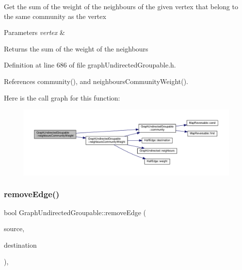 Get the sum of the weight of the neighbours of the given vertex that belong to the same community as the vertex


\begin{DoxyParams}{Parameters}
{\em vertex} & \\
\hline
\end{DoxyParams}
\begin{DoxyReturn}{Returns}
the sum of the weight of the neighbours 
\end{DoxyReturn}


Definition at line 686 of file graph\+Undirected\+Groupable.\+h.



References community(), and neighbours\+Community\+Weight().

Here is the call graph for this function\+:
\nopagebreak
\begin{figure}[H]
\begin{center}
\leavevmode
\includegraphics[width=350pt]{classGraphUndirectedGroupable_a41c4955a6238924a861fe18e8d7a9ee9_cgraph}
\end{center}
\end{figure}
\mbox{\label{classGraphUndirectedGroupable_ad1a488cc292d7e63d289f598aeaaacd6}} 
\subsubsection{\texorpdfstring{remove\+Edge()}{removeEdge()}\hspace{0.1cm}{\footnotesize\ttfamily [1/2]}}
{\footnotesize\ttfamily bool Graph\+Undirected\+Groupable\+::remove\+Edge (\begin{DoxyParamCaption}\item[{const \hyperlink{edge_8h_a5fbd20c46956d479cb10afc9855223f6}{type\+Vertex} \&}]{source,  }\item[{const \hyperlink{edge_8h_a5fbd20c46956d479cb10afc9855223f6}{type\+Vertex} \&}]{destination }\end{DoxyParamCaption})\hspace{0.3cm}{\ttfamily [inline]}, {\ttfamily [virtual]}}

